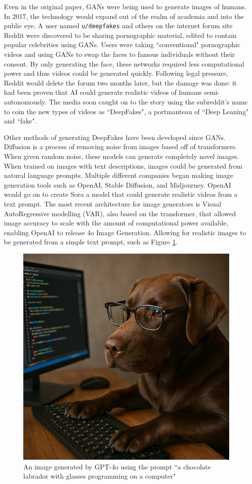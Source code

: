 Even in the original paper, GANs were being used to generate images of humans\cite{goodfellow2014generative}. In 2017, the technology would expand out of the realm of academia and into the public eye. A user named \verb|u/deepfakes| and others on the internet forum site Reddit were discovered to be sharing pornographic material, edited to contain popular celebrities using GANs\cite{cole2018reddit}. Users were taking ``conventional" pornographic videos and using GANs to swap the faces to famous individuals without their consent. By only generating the face, these networks required less computational power and thus videos could be generated quickly. Following legal pressure, Reddit would delete the forum two months later\cite{cole2018reddit}, but the damage was done: it had been proven that AI could generate realistic videos of humans semi-autonomously. The media soon caught on to the story using the subreddit's name to coin the new types of videos as ``DeepFakes", a portmanteau of ``Deep Leaning" and ``fake".

Other methods of generating DeepFakes have been developed since GANs. Diffusion\cite{rombach2022high} is a process of removing noise from images based off of transformers\cite{vaswani2017attention}. When given random noise, these models can generate completely novel images. When trained on images with text descriptions, images could be generated from natural language prompts. Multiple different companies began making image generation tools such as OpenAI\cite{ramesh2022hierarchical}, Stable Diffusion\cite{stablediffusion2022}, and Midjourney\cite{midjourney2022}. OpenAI would go on to create Sora\cite{brooks2024video} a model that could generate realistic videos from a text prompt. The most recent architecture for image generators is Visual AutoRegressive modelling (VAR)\cite{tian2024visual}, also based on the transformer, that allowed image accuracy to scale with the amount of computational power available, enabling OpenAI to release 4o Image Generation\cite{4oimagegen}. Allowing for realistic images to be generated from a simple text prompt, such as Figure \ref{fig:gpt4o-dog}.

\begin{figure}[h]
    \centering
    \includegraphics[width=0.5\linewidth]{dissertation//figures/gpt4o.png}
    \caption{An image generated by GPT-4o\cite{4oimagegen} using the prompt ``a chocolate labrador with glasses programming on a computer"}
    \label{fig:gpt4o-dog}
\end{figure}

